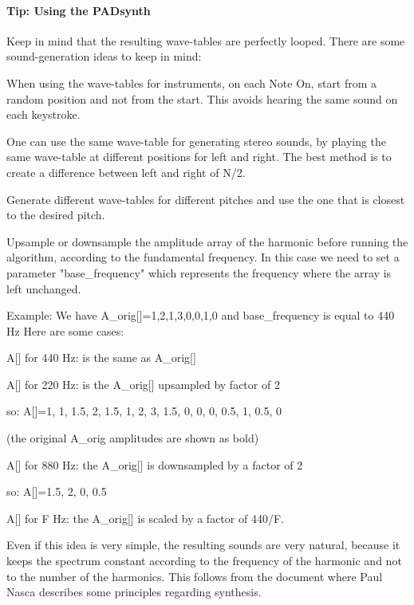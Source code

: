 \paragraph{Tip: Using the PADsynth}
\label{tips_using_the_padsynth}

   Keep in mind that the resulting wave-tables are perfectly looped.
   There are some sound-generation ideas to keep in mind:

   \begin{enumber}
      \item When using the wave-tables for instruments, on each Note On, start
         from a random position and not from the start. This avoids hearing the
         same sound on each keystroke.
      \item One can use the same wave-table for generating stereo sounds, by
         playing the same wave-table at different positions for left and right.
         The best method is to create a difference between left and
         right of N/2.
      \item Generate different wave-tables for different pitches and use the
         one that is closest to the desired pitch.
      \item Upsample or downsample the amplitude array of the harmonic before
         running the algorithm, according to the fundamental frequency. In this
         case we need to set a parameter "base\_frequency" which represents the
         frequency where the array is left unchanged.
   \end{enumber}

   Example:
   We have A\_orig[]={1,2,1,3,0,0,1,0} and base\_frequency is equal to 440 Hz
   Here are some cases:

A[] for 440 Hz: is the same as A\_orig[]

A[] for 220 Hz: is the A\_orig[] upsampled by factor of 2

so: A[]={1, 1, 1.5, 2, 1.5, 1, 2, 3, 1.5, 0, 0, 0, 0.5, 1, 0.5, 0}

(the original A\_orig amplitudes are shown as bold)

A[] for 880 Hz: the A\_orig[] is downsampled by a factor of 2

so: A[]={1.5, 2, 0, 0.5}

A[] for F Hz: the A\_orig[] is scaled by a factor of 440/F.

   Even if this idea is very simple, the resulting sounds are very natural,
   because it keeps the spectrum constant according to the frequency of the
   harmonic and not to the number of the harmonics. This follows from the
   document where Paul Nasca describes some principles regarding synthesis.

